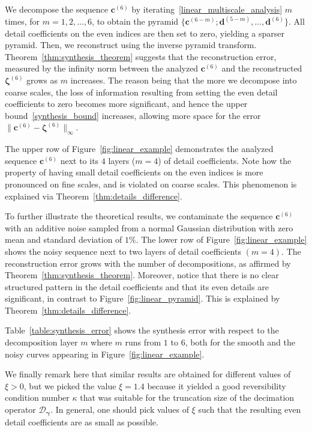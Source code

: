 \documentclass[12pt]{article}
\begin{document}
We decompose the sequence $\boldsymbol{c}^{(6)}$ by iterating~\eqref{linear_multiscale_analysis} $m$ times, for $m=1,2,\dots,6$, to obtain the pyramid $\{ \boldsymbol{c}^{(6-m)}; \boldsymbol{d}^{(5-m)}, \dots, \boldsymbol{d}^{(6)}\}$. All detail coefficients on the even indices are then set to zero, yielding a sparser pyramid. Then, we reconstruct using the inverse pyramid transform. Theorem~\ref{thm:synthesis_theorem} suggests that the reconstruction error, measured by the infinity norm between the analyzed $\boldsymbol{c}^{(6)}$ and the reconstructed $\boldsymbol{\zeta}^{(6)}$ grows as $m$ increases. The reason being that the more we decompose into coarse scales, the loss of information resulting from setting the even detail coefficients to zero becomes more significant, and hence the upper bound~\eqref{synthesis_bound} increases, allowing more space for the error $\|\boldsymbol{c}^{(6)}-\boldsymbol{\zeta}^{(6)}\|_\infty$.

The upper row of Figure~\ref{fig:linear_example} demonstrates the analyzed sequence $\boldsymbol{c}^{(6)}$ next to its $4$ layers ($m=4$) of detail coefficients. Note how the property of having small detail coefficients on the even indices is more pronounced on fine scales, and is violated on coarse scales. This phenomenon is explained via Theorem~\ref{thm:details_difference}.

To further illustrate the theoretical results, we contaminate the sequence $\boldsymbol{c}^{(6)}$ with an additive noise sampled from a normal Gaussian distribution with zero mean and standard deviation of $1\%$. The lower row of Figure~\ref{fig:linear_example} shows the noisy sequence next to two layers of detail coefficients $(m=4)$. The reconstruction error grows with the number of decompositions, as affirmed by Theorem~\ref{thm:synthesis_theorem}. Moreover, notice that there is no clear structured pattern in the detail coefficients and that its even details are significant, in contrast to Figure~\ref{fig:linear_pyramid}. This is explained by Theorem~\ref{thm:details_difference}.

Table~\ref{table:synthesis_error} shows the synthesis error with respect to the decomposition layer $m$ where $m$ runs from $1$ to $6$, both for the smooth and the noisy curves appearing in Figure~\ref{fig:linear_example}.

We finally remark here that similar results are obtained for different values of $\xi>0$, but we picked the value $\xi=1.4$ because it yielded a good reversibility condition number $\kappa$ that was suitable for the truncation size of the decimation operator $\mathcal{D}_{\boldsymbol{\gamma}}$. In general, one should pick values of $\xi$ such that the resulting even detail coefficients are as small as possible.
\end{document}
